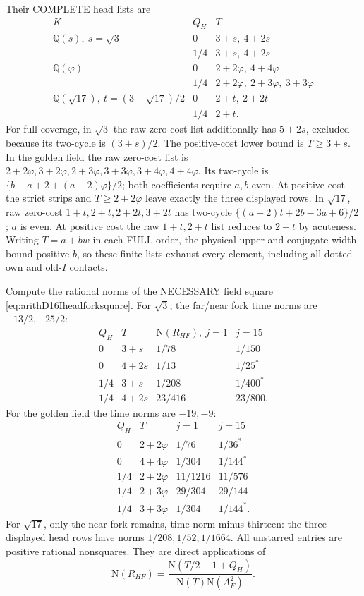 \documentclass[11pt]{article}
\begin{document}
Their COMPLETE head lists are
\[
\begin{array}{c|c|l}
 K&Q_H&T\\ \hline
 \mathbb Q(s),\ s=\sqrt3&0&3+s,\ 4+2s\\
 &1/4&3+s,\ 4+2s\\
 \mathbb Q(\varphi)&0&2+2\varphi,\ 4+4\varphi\\
 &1/4&2+2\varphi,\ 2+3\varphi,\ 3+3\varphi\\
 \mathbb Q(\sqrt{17}),\ t=(3+\sqrt{17})/2&0&2+t,\ 2+2t\\
 &1/4&2+t .
\end{array}
\]
For full coverage, in \(\sqrt3\) the
raw zero-cost list additionally has
\(5+2s\), excluded because its two-cycle
is \((3+s)/2\).
The positive-cost lower bound is \(T\ge3+s\).
In the golden field the raw zero-cost
list is
\(2+2\varphi,3+2\varphi,2+3\varphi,
3+3\varphi,3+4\varphi,4+4\varphi\).
Its two-cycle is
\(\{b-a+2+(a-2)\varphi\}/2\);
both coefficients require \(a,b\) even.
At positive cost the strict strips and
\(T\ge2+2\varphi\) leave exactly the
three displayed rows.
In \(\sqrt{17}\), raw zero-cost
\(1+t,2+t,2+2t,3+2t\) has two-cycle
\(\{(a-2)t+2b-3a+6\}/2\);
\(a\) is even.
At positive cost the raw \(1+t,2+t\)
list reduces to \(2+t\) by acuteness.
Writing \(T=a+bw\) in each FULL order,
the physical upper and conjugate width
bound positive \(b\), so these finite
lists exhaust every element, including
all dotted own and old-\(I\) contacts.

Compute the rational norms of the
NECESSARY field square
\eqref{eq:arithD16Iheadforksquare}.
For \(\sqrt3\), the far/near fork
time norms are \(-13/2,-25/2\):
\[
\begin{array}{c|c|cc}
 Q_H&T&\mathrm N(R_{HF}),\ j=1&j=15\\ \hline
0&3+s&1/78&1/150\\
0&4+2s&1/13&1/25^*\\
1/4&3+s&1/208&1/400^*\\
1/4&4+2s&23/416&23/800 .
\end{array}
\]
For the golden field the time norms
are \(-19,-9\):
\[
\begin{array}{c|c|cc}
 Q_H&T&j=1&j=15\\ \hline
0&2+2\varphi&1/76&1/36^*\\
0&4+4\varphi&1/304&1/144^*\\
1/4&2+2\varphi&11/1216&11/576\\
1/4&2+3\varphi&29/304&29/144\\
1/4&3+3\varphi&1/304&1/144^* .
\end{array}
\]
For \(\sqrt{17}\), only the near
fork remains, time norm minus thirteen:
the three displayed head rows have
norms \(1/208,1/52,1/1664\).
All unstarred entries are positive
rational nonsquares.
They are direct applications of
\[
 \mathrm N(R_{HF})=
 {\frac{\mathrm N(T/2-1+Q_H)}{\mathrm N(T)\mathrm N(A_F^2)}} .
\]
\end{document}
